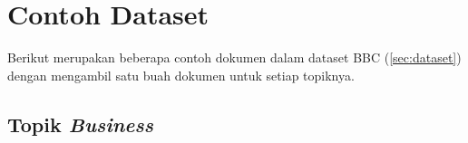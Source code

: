 \chapter{Contoh Dataset}
\label{lamp:C}

Berikut merupakan beberapa contoh dokumen dalam dataset BBC (\ref{sec:dataset}) dengan mengambil satu buah dokumen untuk setiap topiknya.

\section{Topik \textit{Business}}
